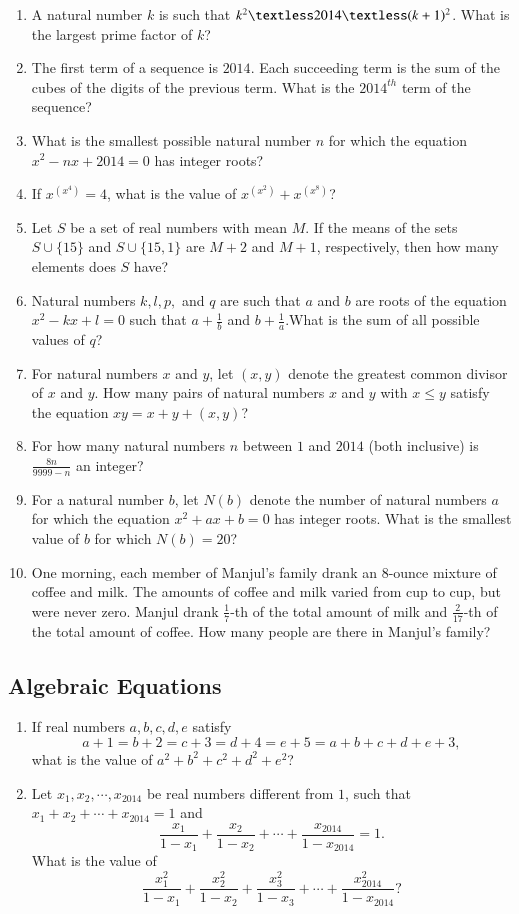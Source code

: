 \documentclass[12pt,letter paper]{article}
\providecommand{\brak}[1]{\ensuremath{\left(#1\right)}}
\begin{document}
\begin{enumerate}
   \item A natural number $k$ is such that $k^2 \textless 2014 \textless (k+1)^2$. What is the largest prime factor of $k$?
   \item The first term of a sequence is $2014$. Each succeeding term is the sum of the cubes of the digits of the previous term. What is the $2014^{th}$ term of the sequence?
   \item What is the smallest possible natural number $n$ for which the equation $x^2 - nx + 2014 = 0$ has integer roots?
   \item If $x^{(x^4)} = 4$, what is the value of $x^{(x^2)} + x^{(x^8)}$?
   \item Let $S$ be a set of real numbers with mean $M$. If the means of the sets $S \cup \{15\}$ and $S \cup \{15, 1\}$ are $M + 2$ and $M + 1$, respectively, then how many elements does $S$ have?
   \item Natural numbers $k, l, p,$ and $q$ are such that $a$ and $b$ are roots of the equation $x^2 - kx + l = 0$ such that $a + \frac{1}{b}$ and $b + \frac{1}{a}.$What is the sum of all possible values of $q$?
   \item For natural numbers $x$ and $y$, let $(x, y)$ denote the greatest common divisor of $x$ and $y$. How many pairs of natural numbers $x$ and $y$ with $x \leq y$ satisfy the equation $xy = x + y + (x, y)$?
   \item For how many natural numbers $n$ between $1$ and $2014$ (both inclusive) is $\frac{8n}{9999 - n}$ an integer?
   \item For a natural number $b$, let $N\brak{b}$ denote the number of natural numbers $a$ for which the equation $x^2 + ax + b = 0$ has integer roots. What is the smallest value of $b$ for which $N\brak{b} = 20$?
    \item One morning, each member of Manjul's family drank an 8-ounce mixture of coffee and milk. The amounts of coffee and milk varied from cup to cup, but were never zero. Manjul drank $\frac{1}{7}$-th of the total amount of milk and $\frac{2}{17}$-th of the total amount of coffee. How many people are there in Manjul's family?
\end{enumerate}
\begin{center}
	\section*{Algebraic Equations}
\end{center}
\begin{enumerate}
\item If real numbers $a, b, c, d, e$ satisfy
    \[
        a + 1 = b + 2 = c + 3 = d + 4 = e + 5 = a + b + c + d + e + 3,
    \]
    what is the value of $a^2 + b^2 + c^2 + d^2 + e^2$?
    \item Let $x_1, x_2, \cdots, x_{2014}$ be real numbers different from $1$, such that$x_1 + x_2 + \cdots + x_{2014} = 1$ and
    \[
        \frac{x_1}{1 - x_1} + \frac{x_2}{1 - x_2} + \cdots + \frac{x_{2014}}{1 - x_{2014}} = 1.
    \]
    What is the value of
    \[
        \frac{x_1^2}{1 - x_1} + \frac{x_2^2}{1 - x_2} + \frac{x_3^2}{1 - x_3} + \cdots + \frac{x_{2014}^2}{1 - x_{2014}}?
    \]
\end{enumerate}
\end{document}
